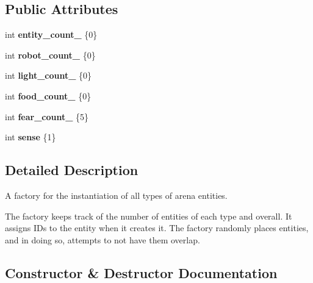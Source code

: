 \subsection*{Public Attributes}
\begin{DoxyCompactItemize}
\item 
\mbox{\label{class_entity_factory_aa53d4bb51d0cd74024080b87e42577f9}} 
int {\bfseries entity\+\_\+count\+\_\+} \{0\}
\item 
\mbox{\label{class_entity_factory_a4142b8531802417f4dda36c297c5c05e}} 
int {\bfseries robot\+\_\+count\+\_\+} \{0\}
\item 
\mbox{\label{class_entity_factory_aefd32f0dd502d7eedaefe8a0f245992f}} 
int {\bfseries light\+\_\+count\+\_\+} \{0\}
\item 
\mbox{\label{class_entity_factory_a932b4b34f1b5d592488520c9ce004810}} 
int {\bfseries food\+\_\+count\+\_\+} \{0\}
\item 
\mbox{\label{class_entity_factory_af7ae85b5eebd8c9d1b6015cd89936e65}} 
int {\bfseries fear\+\_\+count\+\_\+} \{5\}
\item 
\mbox{\label{class_entity_factory_a117adf5c2d5033c26294c5e0db3c0eda}} 
int {\bfseries sense} \{1\}
\end{DoxyCompactItemize}


\subsection{Detailed Description}
A factory for the instantiation of all types of arena entities. 

The factory keeps track of the number of entities of each type and overall. It assigns ID\textquotesingle{}s to the entity when it creates it. The factory randomly places entities, and in doing so, attempts to not have them overlap. 

\subsection{Constructor \& Destructor Documentation}
\mbox{\label{class_entity_factory_abaf0c4ceaa682e55f69b0ceae230008a}} 
